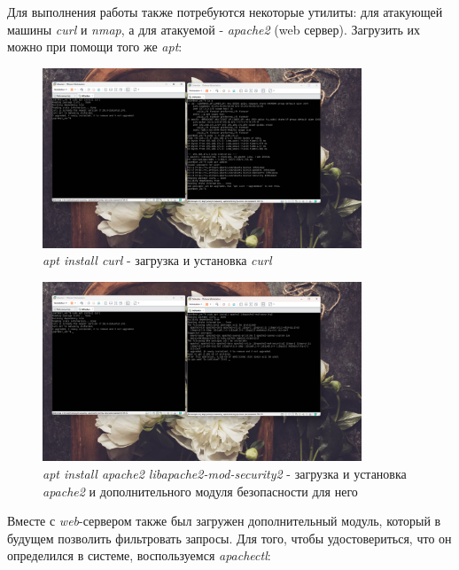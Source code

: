 \documentclass[a4paper]{article}
\begin{document}
  Для выполнения работы также потребуются некоторые утилиты: для атакующей машины \textit{curl}
  и \textit{nmap}, а для атакуемой - \textit{apache2} (web сервер). Загрузить их можно
  при помощи того же \textit{apt}:

  \begin{figure}[H]
    \centering
    \includegraphics[width=0.85\textwidth]{03_00 (33)}
    \caption{\textit{apt install curl} - загрузка и установка \textit{curl}}
    \label{img:33}
  \end{figure}

  \begin{figure}[H]
    \centering
    \includegraphics[width=0.85\textwidth]{03_00 (35)}
    \caption{\textit{apt install apache2 libapache2-mod-security2} - загрузка и установка \textit{apache2} и дополнительного модуля безопасности для него}
    \label{img:35}
  \end{figure}

  Вместе с \textit{web}-сервером также был загружен дополнительный модуль, который
  в будущем позволить фильтровать запросы. Для того, чтобы удостовериться, что он определился
  в системе, воспользуемся \textit{apachectl}:
\end{document}
